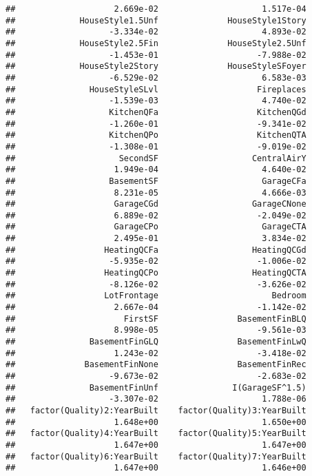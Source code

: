 \documentclass[
]{article}
\begin{document}
\begin{verbatim}
##                    2.669e-02                     1.517e-04  
##             HouseStyle1.5Unf              HouseStyle1Story  
##                   -3.334e-02                     4.893e-02  
##             HouseStyle2.5Fin              HouseStyle2.5Unf  
##                   -1.453e-01                    -7.988e-02  
##             HouseStyle2Story              HouseStyleSFoyer  
##                   -6.529e-02                     6.583e-03  
##               HouseStyleSLvl                    Fireplaces  
##                   -1.539e-03                     4.740e-02  
##                   KitchenQFa                    KitchenQGd  
##                   -1.260e-01                    -9.341e-02  
##                   KitchenQPo                    KitchenQTA  
##                   -1.308e-01                    -9.019e-02  
##                     SecondSF                   CentralAirY  
##                    1.949e-04                     4.640e-02  
##                   BasementSF                     GarageCFa  
##                    8.231e-05                     4.666e-03  
##                    GarageCGd                   GarageCNone  
##                    6.889e-02                    -2.049e-02  
##                    GarageCPo                     GarageCTA  
##                    2.495e-01                     3.834e-02  
##                  HeatingQCFa                   HeatingQCGd  
##                   -5.935e-02                    -1.006e-02  
##                  HeatingQCPo                   HeatingQCTA  
##                   -8.126e-02                    -3.626e-02  
##                  LotFrontage                       Bedroom  
##                    2.667e-04                    -1.142e-02  
##                      FirstSF                BasementFinBLQ  
##                    8.998e-05                    -9.561e-03  
##               BasementFinGLQ                BasementFinLwQ  
##                    1.243e-02                    -3.418e-02  
##              BasementFinNone                BasementFinRec  
##                   -9.673e-02                    -2.683e-02  
##               BasementFinUnf               I(GarageSF^1.5)  
##                   -3.307e-02                     1.788e-06  
##   factor(Quality)2:YearBuilt    factor(Quality)3:YearBuilt  
##                    1.648e+00                     1.650e+00  
##   factor(Quality)4:YearBuilt    factor(Quality)5:YearBuilt  
##                    1.647e+00                     1.647e+00  
##   factor(Quality)6:YearBuilt    factor(Quality)7:YearBuilt  
##                    1.647e+00                     1.646e+00  

\end{verbatim}
\end{document}
